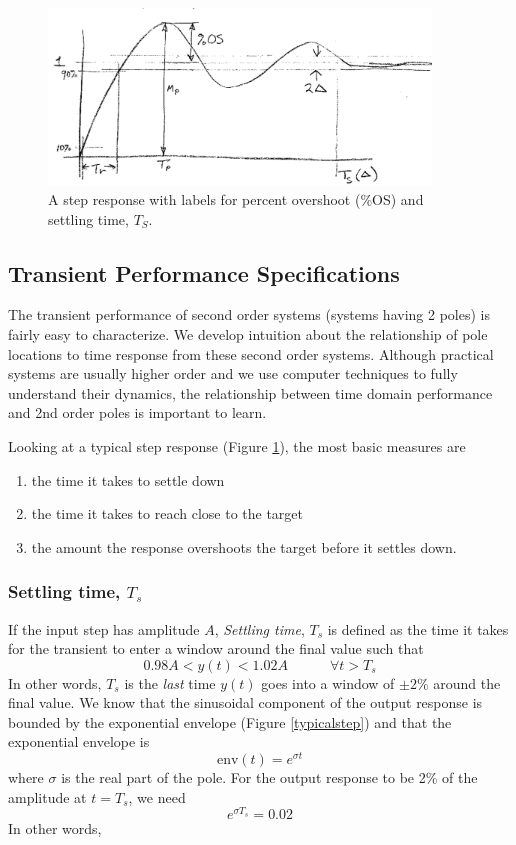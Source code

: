 \begin{figure}\centering
\includegraphics[width=4.0in]{figs11/00472a.png}
\caption{A step response with labels for percent overshoot (\%OS) and settling time, $T_S$.}\label{stepresponse}
\end{figure}


\subsection{Transient Performance Specifications}

The transient performance of second order systems (systems having 2 poles) is fairly easy to characterize.  We develop intuition about the relationship of pole locations to time response from these second order systems.  Although practical systems are usually higher order and we use computer techniques to fully understand their dynamics, the relationship between time domain performance and 2nd order poles is important to learn.

Looking at a typical step response (Figure \ref{stepresponse}), the most basic measures are
\begin{enumerate}
    \item the time it takes to settle down
    \item the time it takes to reach close to the target
    \item the amount the response overshoots the target before it settles down.
\end{enumerate}

\subsubsection{Settling time, $T_s$}
If the input step has amplitude $A$,
{\it Settling time}, $T_s$ is defined as the time it takes for the transient to enter a window around the final value such that
\[
0.98A < y(t) < 1.02A   \qquad\quad \forall t > T_s
\]
In other words, $T_s$ is the {\it last} time $y(t)$ goes into a window of $\pm2\%$ around the final value.
We know that the sinusoidal component of the output response is bounded by the exponential envelope (Figure \ref{typicalstep}) and that the exponential envelope is
\[
\mathrm{env}(t) = e^{\sigma t}
\]
where $\sigma$ is the real part of the pole.  For the output response to be 2\% of the amplitude at $t=T_s$, we need
\[
e^{\sigma T_s} = 0.02
\]
In other words,

